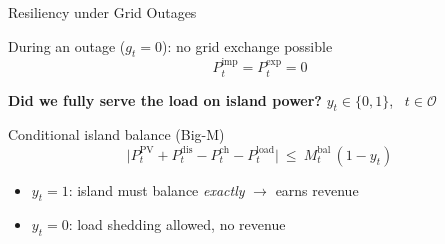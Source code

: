 \documentclass[aspectratio=169]{beamer}
\begin{document}
\begin{frame}{Resiliency under Grid Outages}
\begin{block}{During an outage ($g_t = 0$): no grid exchange possible}
    \[ P^{\text{imp}}_t = P^{\text{exp}}_t = 0 \]
\end{block}

\textbf{Did we fully serve the load on island power?}\quad
$y_t \in \{0,1\}$, \ $t \in \mathcal{O}$

\begin{block}{Conditional island balance (Big-M)}
    \[
        \bigl| P^{\text{PV}}_t + P^{\text{dis}}_t - P^{\text{ch}}_t
        - P^{\text{load}}_t \bigr|
        \ \leq\ M^{\text{bal}}_t\,(1 - y_t)
    \]
\end{block}

\begin{itemize}\footnotesize
    \item $y_t = 1$: island must balance \emph{exactly} $\rightarrow$ earns revenue
    \item $y_t = 0$: load shedding allowed, no revenue
\end{itemize}
\end{frame}
\end{document}
